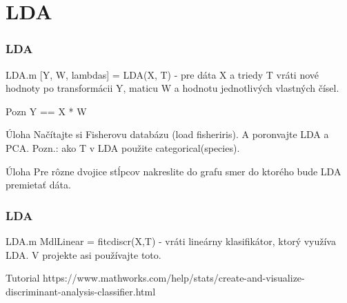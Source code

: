 \documentclass{beamer}
\begin{document}
\section{LDA}
\begin{frame}
\frametitle{LDA}

\begin{block}{LDA.m}
[Y, W, lambdas] = LDA(X, T) - pre dáta X a triedy T vráti nové hodnoty po transformácii Y, maticu W a hodnotu jednotlivých vlastných čísel.
\end{block}

\begin{block}{Pozn}
Y == X * W
\end{block}

\begin{block}{Úloha}
Načítajte si Fisherovu databázu (load fisheriris). A poronvajte LDA a PCA. Pozn.: ako T v LDA použite categorical(species).
\end{block}

\begin{block}{Úloha}
Pre rôzne dvojice stĺpcov nakreslite do grafu smer do ktorého bude LDA premietať dáta.
\end{block}
\end{frame}


\begin{frame}
\frametitle{LDA}

\begin{block}{LDA.m}
MdlLinear = fitcdiscr(X,T) - vráti lineárny klasifikátor, ktorý využíva LDA. V projekte asi používajte toto.
\end{block}

\begin{block}{Tutorial}
https://www.mathworks.com/help/stats/create-and-visualize-discriminant-analysis-classifier.html
\end{block}
\end{frame}
\end{document}
